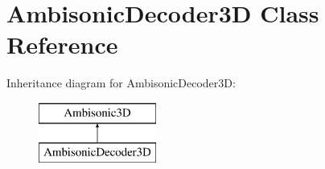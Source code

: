 \hypertarget{class_ambisonic_decoder3_d}{\section{Ambisonic\-Decoder3\-D Class Reference}
\label{class_ambisonic_decoder3_d}
}
Inheritance diagram for Ambisonic\-Decoder3\-D\-:\begin{figure}[H]
\begin{center}
\leavevmode
\includegraphics[height=2.000000cm]{class_ambisonic_decoder3_d}
\end{center}
\end{figure}
